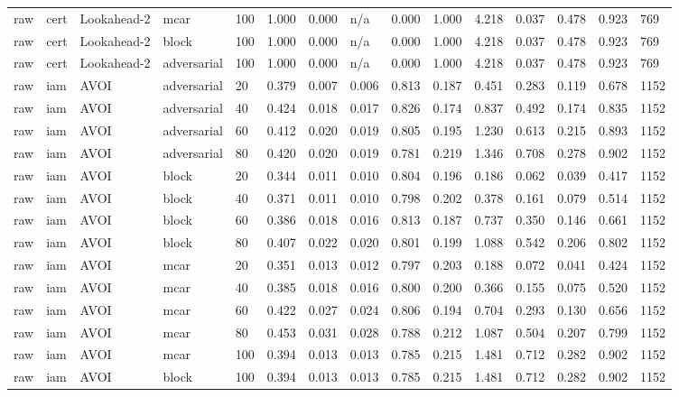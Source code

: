 \begin{table}[!ht]
{\begin{tabular}{lllllllllllllll}
raw & cert & Lookahead-2 & mcar & 100 & 1.000 & 0.000 & n/a & 0.000 & 1.000 & 4.218 & 0.037 & 0.478 & 0.923 & 769 \\
raw & cert & Lookahead-2 & block & 100 & 1.000 & 0.000 & n/a & 0.000 & 1.000 & 4.218 & 0.037 & 0.478 & 0.923 & 769 \\
raw & cert & Lookahead-2 & adversarial & 100 & 1.000 & 0.000 & n/a & 0.000 & 1.000 & 4.218 & 0.037 & 0.478 & 0.923 & 769 \\
raw & iam & AVOI & adversarial & 20 & 0.379 & 0.007 & 0.006 & 0.813 & 0.187 & 0.451 & 0.283 & 0.119 & 0.678 & 1152 \\
raw & iam & AVOI & adversarial & 40 & 0.424 & 0.018 & 0.017 & 0.826 & 0.174 & 0.837 & 0.492 & 0.174 & 0.835 & 1152 \\
raw & iam & AVOI & adversarial & 60 & 0.412 & 0.020 & 0.019 & 0.805 & 0.195 & 1.230 & 0.613 & 0.215 & 0.893 & 1152 \\
raw & iam & AVOI & adversarial & 80 & 0.420 & 0.020 & 0.019 & 0.781 & 0.219 & 1.346 & 0.708 & 0.278 & 0.902 & 1152 \\
raw & iam & AVOI & block & 20 & 0.344 & 0.011 & 0.010 & 0.804 & 0.196 & 0.186 & 0.062 & 0.039 & 0.417 & 1152 \\
raw & iam & AVOI & block & 40 & 0.371 & 0.011 & 0.010 & 0.798 & 0.202 & 0.378 & 0.161 & 0.079 & 0.514 & 1152 \\
raw & iam & AVOI & block & 60 & 0.386 & 0.018 & 0.016 & 0.813 & 0.187 & 0.737 & 0.350 & 0.146 & 0.661 & 1152 \\
raw & iam & AVOI & block & 80 & 0.407 & 0.022 & 0.020 & 0.801 & 0.199 & 1.088 & 0.542 & 0.206 & 0.802 & 1152 \\
raw & iam & AVOI & mcar & 20 & 0.351 & 0.013 & 0.012 & 0.797 & 0.203 & 0.188 & 0.072 & 0.041 & 0.424 & 1152 \\
raw & iam & AVOI & mcar & 40 & 0.385 & 0.018 & 0.016 & 0.800 & 0.200 & 0.366 & 0.155 & 0.075 & 0.520 & 1152 \\
raw & iam & AVOI & mcar & 60 & 0.422 & 0.027 & 0.024 & 0.806 & 0.194 & 0.704 & 0.293 & 0.130 & 0.656 & 1152 \\
raw & iam & AVOI & mcar & 80 & 0.453 & 0.031 & 0.028 & 0.788 & 0.212 & 1.087 & 0.504 & 0.207 & 0.799 & 1152 \\
raw & iam & AVOI & mcar & 100 & 0.394 & 0.013 & 0.013 & 0.785 & 0.215 & 1.481 & 0.712 & 0.282 & 0.902 & 1152 \\
raw & iam & AVOI & block & 100 & 0.394 & 0.013 & 0.013 & 0.785 & 0.215 & 1.481 & 0.712 & 0.282 & 0.902 & 1152 \\

\end{tabular}}
\end{table}
